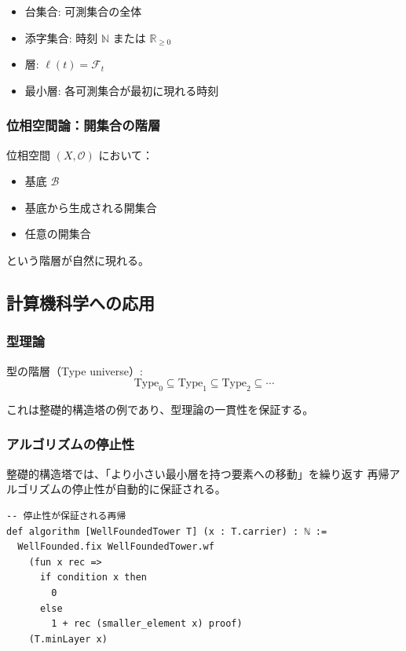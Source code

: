 \documentclass[a4paper,12pt]{ltjsarticle}
\begin{document}
\begin{itemize}
    \item 台集合: 可測集合の全体
    \item 添字集合: 時刻 $\mathbb{N}$ または $\mathbb{R}_{\geq 0}$
    \item 層: $\ell(t) = \mathcal{F}_t$
    \item 最小層: 各可測集合が最初に現れる時刻
\end{itemize}

\subsubsection{位相空間論：開集合の階層}

位相空間 $(X, \mathcal{O})$ において：
\begin{itemize}
    \item 基底 $\mathcal{B}$
    \item 基底から生成される開集合
    \item 任意の開集合
\end{itemize}

という階層が自然に現れる。

\subsection{計算機科学への応用}

\subsubsection{型理論}

型の階層（Type universe）:
\[\mathrm{Type}_0 \subseteq \mathrm{Type}_1 \subseteq \mathrm{Type}_2 \subseteq \cdots\]

これは整礎的構造塔の例であり、型理論の一貫性を保証する。

\subsubsection{アルゴリズムの停止性}

整礎的構造塔では、「より小さい最小層を持つ要素への移動」を繰り返す
再帰アルゴリズムの停止性が自動的に保証される。

\begin{lstlisting}[style=leanstyle]
-- 停止性が保証される再帰
def algorithm [WellFoundedTower T] (x : T.carrier) : ℕ :=
  WellFounded.fix WellFoundedTower.wf
    (fun x rec =>
      if condition x then
        0
      else
        1 + rec (smaller_element x) proof)
    (T.minLayer x)
\end{lstlisting}
\end{document}
